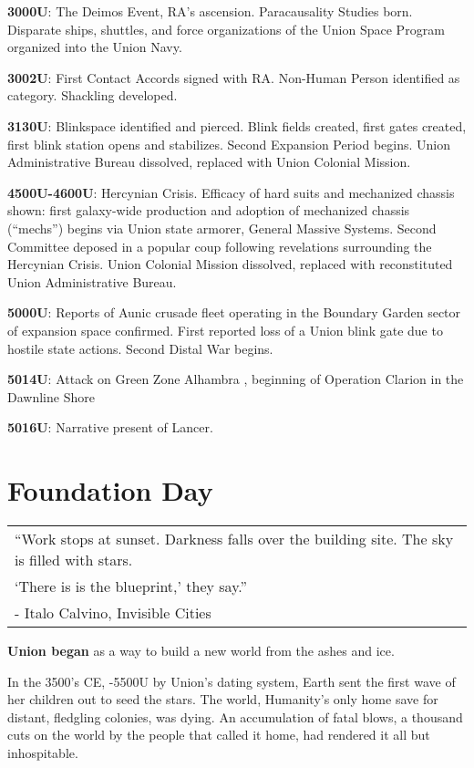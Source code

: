\textbf{3000U}: The Deimos Event, RA’s ascension. Paracausality Studies born. Disparate ships, shuttles,
and force organizations of the Union Space Program organized into the Union Navy.

\textbf{3002U}: First Contact Accords signed with RA. Non-Human Person identified as category.
Shackling developed.

\textbf{3130U}: Blinkspace identified and pierced. Blink fields created, first gates created, first blink
station opens and stabilizes. Second Expansion Period begins. Union Administrative Bureau
dissolved, replaced with Union Colonial Mission.

\textbf{4500U-4600U}: Hercynian Crisis. Efficacy of hard suits and mechanized chassis shown: first
galaxy-wide production and adoption of mechanized chassis (“mechs”) begins via Union state
armorer, General Massive Systems. Second Committee deposed in a popular coup following
revelations surrounding the Hercynian Crisis. Union Colonial Mission dissolved, replaced with
reconstituted Union Administrative Bureau.

\textbf{5000U}: Reports of Aunic crusade fleet operating in the Boundary Garden sector of expansion
space confirmed. First reported loss of a Union blink gate due to hostile state actions. Second
Distal War begins.

\textbf{5014U}: Attack on Green Zone Alhambra , beginning of Operation Clarion in the Dawnline Shore

\textbf{5016U}: Narrative present of Lancer.

\section{Foundation Day}

\begin{center}
  \itshape
  \begin{tabular}{l}
    “Work stops at sunset. Darkness falls over the building site. The sky is filled with stars.\\
    ‘There is is the blueprint,’ they say.”\\
    \quad - Italo Calvino, \textnormal{Invisible Cities}
  \end{tabular}
\end{center}

\textbf{\Large Union began} as a way to build a new world from the ashes and ice.


In the 3500’s CE, -5500U by Union’s dating system, Earth sent the first wave of her children out
to seed the stars. The world, Humanity’s only home save for distant, fledgling colonies, was
dying. An accumulation of fatal blows, a thousand cuts on the world by the people that called it
home, had rendered it all but inhospitable.


